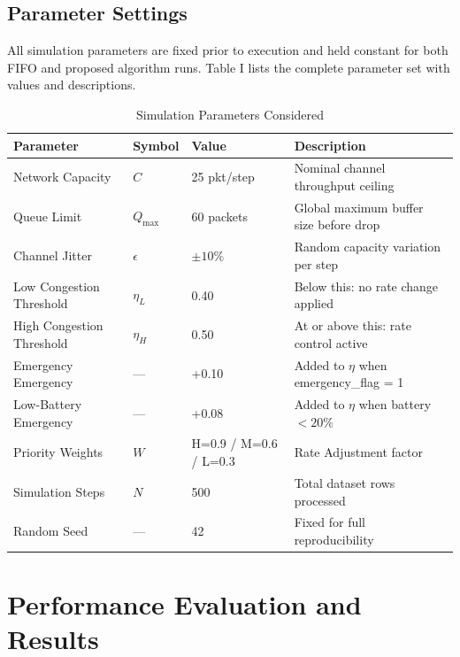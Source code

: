 \documentclass[pdflatex,sn-mathphys-num]{sn-jnl}%
\theoremstyle{thmstyleone}%
\theoremstyle{thmstyletwo}%
\theoremstyle{thmstylethree}%
\begin{document}
\subsection{ Parameter Settings }

All simulation parameters are fixed prior to execution and held constant for both FIFO and proposed algorithm runs. Table I lists the complete parameter set with values and descriptions.

\begin{table}[h]
\centering
\small
\begin{tabular}{|l|l|l|p{5cm}|}
\hline
\textbf{Parameter} & \textbf{Symbol} & \textbf{Value} & \textbf{Description} \\ \hline

Network Capacity & $C$ & 25 pkt/step & Nominal channel throughput ceiling \\ \hline
Queue Limit & $Q_{\max}$ & 60 packets & Global maximum buffer size before drop \\ \hline
Channel Jitter & $\epsilon$ & $\pm 10\%$ & Random capacity variation per step \\ \hline
Low Congestion Threshold & $\eta_L$ & 0.40 & Below this: no rate change applied \\ \hline
High Congestion Threshold & $\eta_H$ & 0.50 & At or above this: rate control active \\ \hline
Emergency Emergency & — & +0.10 & Added to $\eta$ when emergency\_flag = 1 \\ \hline
Low-Battery Emergency & — & +0.08 & Added to $\eta$ when battery $< 20\%$ \\ \hline
Priority Weights & $W$ & H=0.9 / M=0.6 / L=0.3 & Rate Adjustment factor \\ \hline
Simulation Steps & $N$ & 500 & Total dataset rows processed \\ \hline
Random Seed & — & 42 & Fixed for full reproducibility \\ \hline

\end{tabular}
\caption{Simulation Parameters Considered}
\end{table}





\section{ Performance Evaluation and Results }
\end{document}
